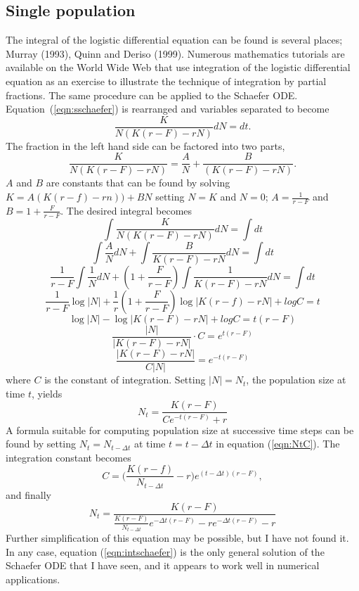 \subsection{Single population}
The integral of the logistic differential equation can be found is
several places;
Murray (1993), Quinn and Deriso (1999).
Numerous mathematics tutorials are available on the World Wide Web
that use
integration of the logistic differential equation as an exercise to
illustrate the technique of integration by partial fractions.
The same procedure can be applied to the Schaefer ODE.
Equation~(\ref{eqn:sschaefer}) is rearranged and variables
separated to become
\begin{equation}
\frac{K}{N(K(r-F)-rN)}dN=dt.
\end{equation}
The fraction in the left hand side can be factored into two parts,
\begin{equation}
\frac{K}{N(K(r-F)-rN)}=\frac{A}{N}+\frac{B}{(K(r-F)-rN)}.
\end{equation}
$A$ and $B$ are constants that can be found by solving
$K=A(K(r-f)-rn))+BN$
setting $N=K$ and $N=0$; 
$A=\frac{1}{r-F}$ and $B=1+\frac{F}{r-F}$.
The desired integral becomes
\[\int\frac{K}{N(K(r-F)-rN)}dN   = \int dt\]
\[\int\frac{A}{N}dN + \int\frac{B}{K(r-F)-rN}dN  = \int dt\]
\[\frac{1}{r-F}\int\frac{1}{N}dN + (1+\frac{F}{r-F})\int\frac{1}{K(r-F)-rN}dN  = \int dt\] 
\[\frac{1}{r-F}\log |N| + \frac{1}{r}(1+\frac{F}{r-F})\log |K(r-f)-rN| +log C  = t\] \[\log |N| - \log |K(r-F)-rN| + log C  = t(r-F)\]
\[\frac{|N|}{|K(r-F)-rN|}\cdot C  =  e^{t(r-F)}\]
\[\frac{|K(r-F)-rN|}{C|N|} =  e^{-t(r-F)}\]
where $C$ is the constant of integration.
Setting $|N| = N_t$, the population size at time $t$, yields
\begin{equation}
\label{eqn:NtC}
N_t=\frac{K(r-F)}{Ce^{-t(r-F)}+r}
\end{equation}
A formula suitable for computing population size at successive
time steps can be found by setting $N_t = N_{t-\Delta t}$ at time
$t=t-\Delta t$ in equation (\ref{eqn:NtC}).
The integration constant becomes
\begin{equation}
C=\Bigg(\frac{K(r-f)}{N_{t-\Delta t}}-r\Bigg)e^{(t-\Delta t)(r-F)},
\end{equation}
and finally
\begin{equation}
\label{eqn:intschaefer}
N_t = \frac{K(r-F)}{\frac{K(r-F)}{N_{t-\Delta t}}e^{-\Delta t(r-F)}-re^{-\Delta t(r-F)} -r}
\end{equation}
Further simplification of this equation may be possible, but I have
not found it. In any case, equation (\ref{eqn:intschaefer}) is the
only general solution of the Schaefer ODE that I have seen, and it appears
to work well in numerical applications.

